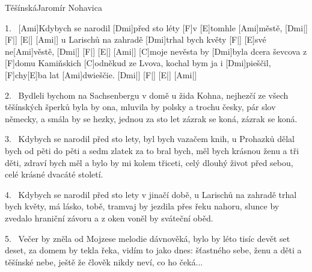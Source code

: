\begin{song}{Těšínská}{Jaromír Nohavica}

\begin{xverse}{1.~}
[Ami]Kdybych se narodil [Dmi]před sto léty [F]v [E]tomhle [Ami]městě, [Dmi|]{} [F|]{} [E|]{} [Ami|]{}
u Larischů na zahradě [Dmi]trhal bych květy [F|{}] [E]své ne[Ami]věstě, [Dmi|]{} [F|]{} [E|]{} [Ami|]{}
[C]moje nevěsta by [Dmi]byla dcera ševcova
z [F]domu Kamiňskich [C]odněkud ze Lvova,
kochal bym ja i [Dmi]pieščil, [F]chy[E]ba lat [Ami]dwieščie. [Dmi|]{} [F|]{} [E|]{} [Ami|]{}
\end{xverse}

\begin{xverse}{2.~}
Bydleli bychom na Sachsenbergu v domě u žida Kohna,
nejhezčí ze všech těšínských šperků byla by ona,
mluvila by polsky a trochu česky,
pár slov německy, a smála by se hezky,
jednou za sto let zázrak se koná, zázrak se koná.
\end{xverse}

\begin{xverse}{3.~}
Kdybych se narodil před sto lety, byl bych vazačem knih,
u Prohazků dělal bych od pěti do pěti a sedm zlatek za to bral bych,
měl bych krásnou ženu a tři děti,
zdraví bych měl a bylo by mi kolem třiceti,
celý dlouhý život před sebou, celé krásné dvacáté století.
\end{xverse}

\begin{xverse}{4.~}
Kdybych se narodil před sto lety v jinačí době,
u Larischů na zahradě trhal bych květy, má lásko, tobě,
tramvaj by jezdila přes řeku nahoru,
slunce by zvedalo hraniční závoru
a z oken voněl by sváteční oběd.
\end{xverse}

\begin{xverse}{5.~}
Večer by zněla od Mojzese melodie dávnověká,
bylo by léto tisíc devět set deset, za domem by tekla řeka,
vidím to jako dnes: šťastného sebe,
ženu a děti a těšínské nebe,
ještě že člověk nikdy neví, co ho čeká...
\end{xverse}

\end{song}




